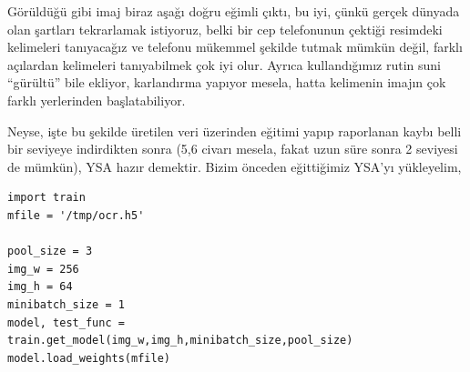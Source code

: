 \documentclass[12pt,fleqn]{article}\usepackage{../../common}
\begin{document}
Görüldüğü gibi imaj biraz aşağı doğru eğimli çıktı, bu iyi, çünkü gerçek
dünyada olan şartları tekrarlamak istiyoruz, belki bir cep telefonunun
çektiği resimdeki kelimeleri tanıyacağız ve telefonu mükemmel şekilde
tutmak mümkün değil, farklı açılardan kelimeleri tanıyabilmek çok iyi
olur. Ayrıca kullandığımız rutin suni ``gürültü'' bile ekliyor, karlandırma
yapıyor mesela, hatta kelimenin imajın çok farklı yerlerinden
başlatabiliyor. 

Neyse, işte bu şekilde üretilen veri üzerinden eğitimi yapıp raporlanan
kaybı belli bir seviyeye indirdikten sonra (5,6 civarı mesela, fakat uzun
süre sonra 2 seviyesi de mümkün), YSA hazır demektir. Bizim önceden
eğittiğimiz YSA'yı yükleyelim,

\begin{verbatim}
import train
mfile = '/tmp/ocr.h5'

pool_size = 3
img_w = 256
img_h = 64
minibatch_size = 1
model, test_func = train.get_model(img_w,img_h,minibatch_size,pool_size)
model.load_weights(mfile)
\end{verbatim}
\end{document}

